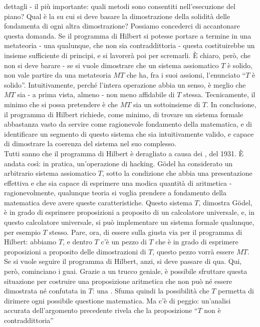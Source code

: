 dettagli - il più importante: quali metodi sono consentiti nell'esecuzione del piano? Qual è la  su cui si deve basare la dimostrazione della solidità delle fondamenta di ogni altra dimostrazione? Possiamo concederci di accantonare questa domanda.
Se il programma di Hilbert si potesse portare a termine in una metateoria - una qualunque, che non sia contraddittoria - questa costituirebbe un insieme sufficiente di principi, e si lavorerà poi per scremarli. È chiaro, però, che non si deve barare - se si vuole dimostrare che un sistema assiomatico
$T$ è solido, non vale partire da una metateoria $MT$ che ha, fra i suoi assiomi, l'enunciato ``$T$ è solido''. Intuitivamente, perché l'intera operazione abbia un senso, è meglio che $MT$ sia - a prima vista, almeno - non meno affidabile di $T$ stessa.
Tecnicamente, il minimo che si possa pretendere è che $MT$ sia un sottoinsieme di $T$. In conclusione, il programma di Hilbert richiede, come minimo, di trovare un sistema formale abbastanza vasto da servire come ragionevole fondamento della matematica, e di identificare un segmento di questo sistema che 
sia intuitivamente valido, e capace di dimostrare la coerenza del sistema nel suo complesso.\\
Tutti sanno che il programma di Hilbert è deragliato a causa dei , del 1931. È andata così: in pratica, un'operazione di hacking. Gödel ha considerato un arbitrario sistema assiomatico $T$,
sotto la condizione che abbia una presentazione effettiva e che sia capace di esprimere una modica quantità di aritmetica - ragionevolmente, qualunque teoria si voglia prendere a fondamento della matematica deve avere queste caratteristiche. Questo sistema $T$, dimostra Gödel, è in grado di esprimere 
proposizioni a proposito di un calcolatore universale, e, in questo calcolatore universale, si può implementare un sistema formale qualunque, per esempio $T$ stesso. Pare, ora, di essere sulla giusta via per il programma di Hilbert: abbiamo $T$, e dentro $T$
c'è un pezzo di $T$ che è in grado di esprimere proposizioni a proposito delle dimostrazioni di $T$, questo pezzo vorrà essere $MT$.
Se si vuole seguire il programma di Hilbert, anzi, si deve passare di qua. Qui, però, cominciano i guai. Grazie a un trucco geniale, è possibile sfruttare questa situazione per costruire una proposizione aritmetica che non 
può né essere dimostrata né confutata in $T$: una . Sfuma quindi la possibilità che $T$ permetta di dirimere ogni possibile questione matematica. Ma c'è di peggio: un'analisi accurata dell'argomento precedente rivela che la proposizione ``$T$ non è contraddittoria''
